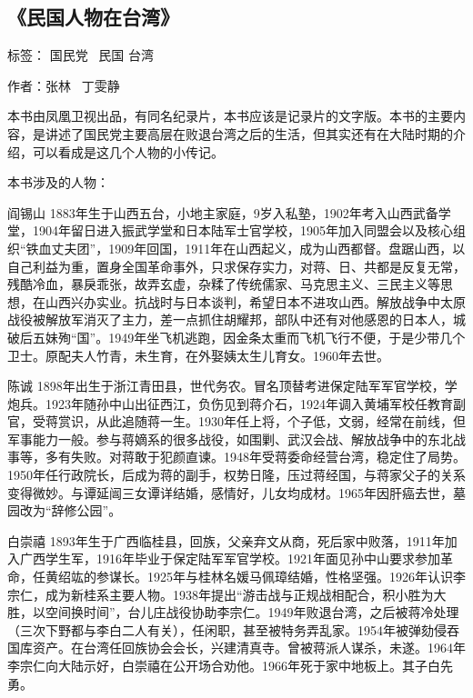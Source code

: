 \subsection{《民国人物在台湾》}

标签： 国民党 \ 民国  台湾

作者：张林 \ 丁雯静

本书由凤凰卫视出品，有同名纪录片，本书应该是记录片的文字版。本书的主要内容，是讲述了国民党主要高层在败退台湾之后的生活，但其实还有在大陆时期的介绍，可以看成是这几个人物的小传记。

本书涉及的人物：

\begin{description*}
    \item[阎锡山] 1883年生于山西五台，小地主家庭，9岁入私塾，1902年考入山西武备学堂，1904年留日进入振武学堂和日本陆军士官学校，1905年加入同盟会以及核心组织“铁血丈夫团”，1909年回国，1911年在山西起义，成为山西都督。盘踞山西，以自己利益为重，置身全国革命事外，只求保存实力，对蒋、日、共都是反复无常，残酷冷血，暴戾乖张，故弄玄虚，杂糅了传统儒家、马克思主义、三民主义等思想，在山西兴办实业。抗战时与日本谈判，希望日本不进攻山西。解放战争中太原战役被解放军消灭了主力，差一点抓住胡耀邦，部队中还有对他感恩的日本人，城破后五妹殉“国”。1949年坐飞机逃跑，因金条太重而飞机飞行不便，于是少带几个卫士。原配夫人竹青，未生育，在外娶姨太生儿育女。1960年去世。
    \item[陈诚] 1898年出生于浙江青田县，世代务农。冒名顶替考进保定陆军军官学校，学炮兵。1923年随孙中山出征西江，负伤见到蒋介石，1924年调入黄埔军校任教育副官，受蒋赏识，从此追随蒋一生。1930年任上将，个子低，文弱，经常在前线，但军事能力一般。参与蒋嫡系的很多战役，如围剿、武汉会战、解放战争中的东北战事等，多有失败。对蒋敢于犯颜直谏。1948年受蒋委命经营台湾，稳定住了局势。1950年任行政院长，后成为蒋的副手，权势日隆，压过蒋经国，与蒋家父子的关系变得微妙。与谭延闿三女谭详结婚，感情好，儿女均成材。1965年因肝癌去世，墓园改为“辞修公园”。
    \item[白崇禧] 1893年生于广西临桂县，回族，父亲弃文从商，死后家中败落，1911年加入广西学生军，1916年毕业于保定陆军军官学校。1921年面见孙中山要求参加革命，任黄绍竑的参谋长。1925年与桂林名媛马佩璋结婚，性格坚强。1926年认识李宗仁，成为新桂系主要人物。1938年提出“游击战与正规战相配合，积小胜为大胜，以空间换时间”，台儿庄战役协助李宗仁。1949年败退台湾，之后被蒋冷处理（三次下野都与李白二人有关），任闲职，甚至被特务弄乱家。1954年被弹劾侵吞国库资产。在台湾任回族协会会长，兴建清真寺。曾被蒋派人谋杀，未遂。1964年李宗仁向大陆示好，白崇禧在公开场合劝他。1966年死于家中地板上。其子白先勇。

\end{description*}
